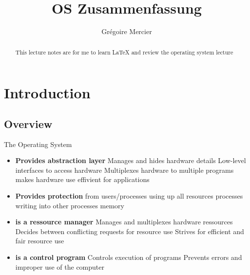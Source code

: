 \documentclass[11pt,a4paper]{article}
\begin{document}
	
	\title{OS Zusammenfassung}
	\author{Grégoire Mercier}
	
	\maketitle
	
	\begin{abstract}
		This lecture notes are for me to learn LaTeX and review the operating system lecture
	\end{abstract}


	\section{Introduction}
	
	\subsection{Overview}
	
	The Operating System
	
	\begin{itemize}
		\item \textbf{Provides abstraction layer} \newline
		Manages and hides hardware details \newline
		Low-level interfaces to access hardware \newline
		Multiplexes hardware to multiple programs \newline
		makes hardware use effivient for applications
		\item \textbf{Provides protection} from \newline
		users/processes using up all resources \newline
		processes writing into other processes memory \newline
		\item \textbf{is a ressource manager} \newline
		Manages and multiplexes hardware ressources \newline
		Decides between conflicting requests for resource use \newline
		Strives for efficient and fair resource use \newline
		\item \textbf{is a control program} \newline
		Controls execution of programs \newline
		Prevents errors and improper use of the computer
		
	\end{itemize}
	
\end{document}
